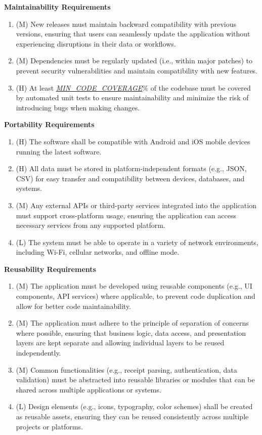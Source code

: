 \documentclass[12pt]{article}
\begin{document}
\textbf{Maintainability Requirements}\label{NFR-MTB}
\begin{enumerate}[label=NFR-MTB-\arabic*]
  \item (M) New releases must maintain backward compatibility with previous
  versions, ensuring that users can seamlessly update the application without
  experiencing disruptions in their data or workflows.
  \item (M) Dependencies must be regularly updated (i.e., within major patches)
  to prevent security vulnerabilities and maintain compatibility with new
  features.
  \item (H) At least
  \hyperref[Table:AuxConstants]{\textit{MIN\_CODE\_COVERAGE}}\% of the codebase
  must be covered by automated unit tests to ensure maintainability and minimize
  the risk of introducing bugs when making changes.
\end{enumerate}

\textbf{Portability Requirements}\label{NFR-PORT}
\begin{enumerate}[label=NFR-PORT-\arabic*]
  \item (H) The software shall be compatible with Android and iOS mobile devices
  running the latest software.
  \item (H) All data must be stored in platform-independent formats (e.g., JSON,
  CSV) for easy transfer and compatibility between devices, databases, and
  systems.
  \item (M) Any external APIs or third-party services integrated into the
  application must support cross-platform usage, ensuring the application can
  access necessary services from any supported platform.
  \item (L) The system must be able to operate in a variety of network
  environments, including Wi-Fi, cellular networks, and offline mode.
\end{enumerate}

\textbf{Reusability Requirements}\label{NFR-REUS}
\begin{enumerate}[label=NFR-REUS-\arabic*]
  \item (M) The application must be developed using reusable components (e.g.,
  UI components, API services) where applicable, to prevent code duplication and
  allow for better code maintainability.
  \item (M) The application must adhere to the principle of separation of
  concerns where possible, ensuring that business logic, data access, and
  presentation layers are kept separate and allowing individual layers to be
  reused independently.
  \item (M) Common functionalities (e.g., receipt parsing, authentication, data
  validation) must be abstracted into reusable libraries or modules that can be
  shared across multiple applications or systems.
  \item (L) Design elements (e.g., icons, typography, color schemes) shall be
  created as reusable assets, ensuring they can be reused consistently across
  multiple projects or platforms.
\end{enumerate}
\end{document}
